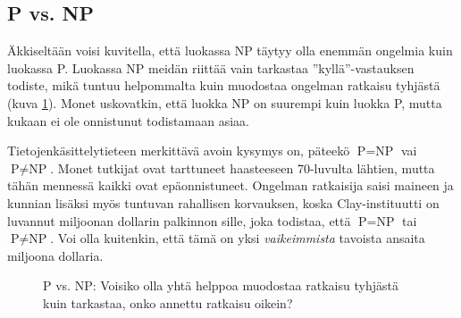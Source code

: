 \subsection{P vs. NP}


Äkkiseltään voisi kuvitella, että luokassa NP täytyy olla
enemmän ongelmia kuin luokassa P.
Luokassa NP meidän riittää vain tarkastaa ''kyllä''-vastauksen
todiste, mikä tuntuu helpommalta kuin muodostaa ongelman ratkaisu tyhjästä (kuva \ref{fig:pvsnpp}).
Monet uskovatkin, että luokka NP on suurempi kuin luokka P,
mutta kukaan ei ole onnistunut todistamaan asiaa.

Tietojenkäsittelytieteen merkittävä avoin kysymys on,
päteekö $\textrm{P}=\textrm{NP}$ vai $\textrm{P} \neq \textrm{NP}$.
Monet tutkijat ovat tarttuneet haasteeseen
70-luvulta lähtien, mutta tähän mennessä kaikki ovat epäonnistuneet.
Ongelman ratkaisija saisi maineen ja kunnian lisäksi
myös tuntuvan rahallisen korvauksen, koska
Clay-instituutti on luvannut miljoonan dollarin palkinnon
sille, joka todistaa, että $\textrm{P}=\textrm{NP}$ tai $\textrm{P} \neq \textrm{NP}$.
Voi olla kuitenkin, että tämä on yksi \emph{vaikeimmista}
tavoista ansaita miljoona dollaria.

\begin{figure}
\center
\begin{center}
\end{center}
\caption{P vs. NP: Voisiko olla yhtä helppoa muodostaa ratkaisu tyhjästä
kuin tarkastaa, onko annettu ratkaisu oikein?}
\label{fig:pvsnpp}
\end{figure}

